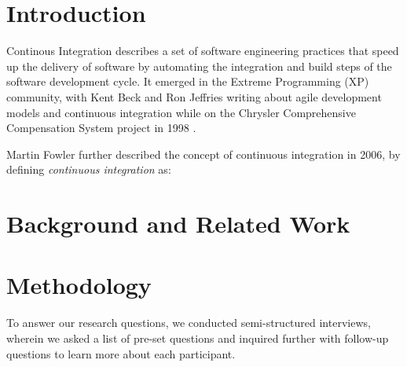 \documentclass{sig-alternate-05-2015}
\begin{document}


\section{Introduction}
Continous Integration describes a set of software engineering practices that speed up the delivery of software by automating the integration and build steps of the software development cycle. It emerged in the Extreme Programming (XP) community, with Kent Beck and Ron Jeffries writing about agile development models and continuous integration while on the Chrysler Comprehensive Compensation System project in 1998 \cite{beck:extreme_programming}\cite{beck:agile_manifesto}.

Martin Fowler further described the concept of continuous integration in 2006, by defining \textit{continuous integration} as:

 \cite{fowler:continuous}

\section{Background and Related Work}
\section{Methodology}
To answer our research questions, we conducted semi-structured interviews, wherein we asked a list of pre-set questions and inquired further with follow-up questions to learn more about each participant. \\
\end{document}
